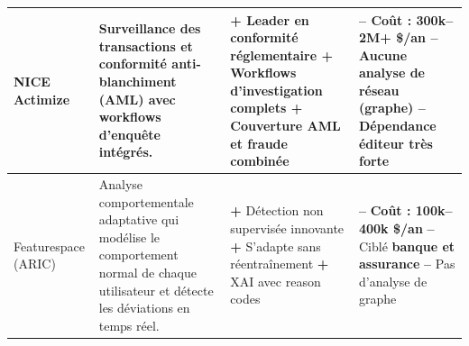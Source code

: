 \documentclass[a4paper, oneside, 12pt]{book}
\begin{document}
\begin{table}[H]
\begin{tabular}{|>{\bfseries\raggedright\arraybackslash}p{2.4cm}|p{3.8cm}|p{4.5cm}|p{4.5cm}|}
NICE Actimize
& Surveillance des transactions et conformité anti-blanchiment (AML) avec workflows d'enquête intégrés.
& \cellcolor{GreenBG}
  \textcolor{GreenTxt}{\textbf{+}} Leader en conformité réglementaire \newline
  \textcolor{GreenTxt}{\textbf{+}} Workflows d'investigation complets \newline
  \textcolor{GreenTxt}{\textbf{+}} Couverture AML et fraude combinée
& 
  \textcolor{RedTxt}{\textbf{--}} \textbf{Coût : 300k--2M+ \$/an} \newline
  \textcolor{RedTxt}{\textbf{--}} Aucune analyse de réseau (graphe) \newline
  \textcolor{RedTxt}{\textbf{--}} Dépendance éditeur très forte \\
\hline

Featurespace (ARIC)
& Analyse comportementale adaptative qui modélise le comportement normal de chaque utilisateur et détecte les déviations en temps réel.
& \cellcolor{GreenBG}
  \textcolor{GreenTxt}{\textbf{+}} Détection non supervisée innovante \newline
  \textcolor{GreenTxt}{\textbf{+}} S'adapte sans réentraînement \newline
  \textcolor{GreenTxt}{\textbf{+}} XAI avec reason codes
& 
  \textcolor{RedTxt}{\textbf{--}} \textbf{Coût : 100k--400k \$/an} \newline
  \textcolor{RedTxt}{\textbf{--}} Ciblé \textbf{banque et assurance} \newline
  \textcolor{RedTxt}{\textbf{--}} Pas d'analyse de graphe \\
\hline


\end{tabular}
\end{table}
 
 
\end{document}
